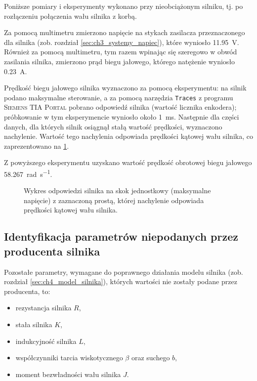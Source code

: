 Poniższe pomiary i eksperymenty wykonano przy nieobciążonym silniku, tj. po rozłączeniu połączenia wału silnika z korbą.

Za pomocą multimetru zmierzono napięcie na stykach zasilacza przeznaczonego dla silnika (zob. rozdział \ref{sec:ch3_systemy_napiec}), które wyniosło \SI{11,95}{\volt}. Również za pomocą multimetru, tym razem wpinając się szeregowo w obwód zasilania silnika, zmierzono prąd biegu jałowego, którego natężenie wyniosło \SI{0,23}{\ampere}.

Prędkość biegu jałowego silnika wyznaczono za pomocą eksperymentu: na silnik podano maksymalne sterowanie, a za pomocą narzędzia \texttt{Traces} z programu \textsc{Siemens TIA Portal} pobrano odpowiedź silnika (wartość licznika enkodera); próbkowanie w tym eksperymencie wyniosło około \SI{1}{\milli\second}. Następnie dla części danych, dla których silnik osiągnął stałą wartość prędkości, wyznaczono nachylenie. Wartość tego nachylenia odpowiada prędkości kątowej wału silnika, co zaprezentowano na \cref{fig:odpowiedz_silnika_na_maksymalny_skok_jednostkowy}.

Z powyższego eksperymentu uzyskano wartość prędkość obrotowej biegu jałowego \SI{58,267}{\radian\per\second}.

\begin{figure}[h]
    \centering
    
    \caption{Wykres odpowiedzi silnika na skok jednostkowy (maksymalne napięcie) z zaznaczoną prostą, której nachylenie odpowiada prędkości kątowej wału silnika.}
    \label{fig:odpowiedz_silnika_na_maksymalny_skok_jednostkowy}
\end{figure}

\subsection{Identyfikacja parametrów niepodanych przez producenta silnika}
\label{subsec:ch6_identyfikacja_parametrow_niepodanych_przez_producenta_silnika}

Pozostałe parametry, wymagane do poprawnego działania modelu silnika (zob. rozdział \ref{sec:ch4_model_silnika}), których wartości nie zostały podane przez producenta, to:

\begin{itemize}
    \item rezystancja silnika $R$,
    \item stała silnika $K$,
    \item indukcyjność silnika $L$,
    \item współczynniki tarcia wiskotycznego $\beta$ oraz suchego $b$,
    \item moment bezwładności wału silnika $J$.
\end{itemize}

